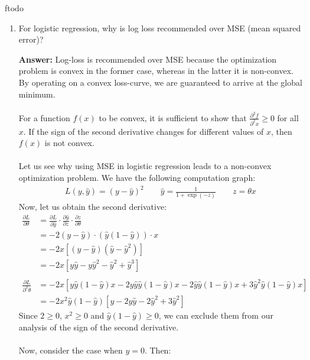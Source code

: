 ƒtodo\documentclass{article}
\newenvironment{QandA}{\begin{enumerate}[label=\arabic*.]}{\end{enumerate}}
\newenvironment{answer}{\par\normalfont \textbf{Answer:}}{}
\begin{document}
\begin{QandA}
    \item For logistic regression, why is log loss recommended over MSE (mean squared error)?
    \begin{answer}
        Log-loss is recommended over MSE because the optimization problem is convex in the former case, whereas in the latter it is non-convex. By operating on a convex loss-curve, we are guaranteed to arrive at the global minimum. \\\\
        For a function $f(x)$ to be convex, it is sufficient to show that $\frac{\partial^2 f}{\partial^2 x} \ge 0$ for all $x$. If the sign of the second derivative changes for different values of $x$, then $f(x)$ is not convex.\\\\
        Let us see why using MSE in logistic regression leads to a non-convex optimization problem. We have the following computation graph:
        \begin{align*}
            L(y, \hat{y}) = (y - \hat{y})^2 \quad\quad \hat{y} = \frac{1}{1 + \exp(-z)} \quad\quad z = \theta x
        \end{align*}
        Now, let us obtain the second derivative:
        \begin{align*}
            \frac{\partial L}{\partial \theta} &= \frac{\partial L}{\partial \hat{y}} \cdot \frac{\partial \hat{y}}{\partial z} \cdot \frac{\partial z}{\partial \theta} \\
            &= -2(y - \hat{y}) \cdot (\hat{y}(1 - \hat{y})) \cdot x \\
            &= -2x \left[ (y - \hat{y})(\hat{y} - \hat{y}^2) \right] \\
            &= -2x \left[ y\hat{y} - y\hat{y}^2 - \hat{y}^2 + \hat{y}^3 \right] \\\\
            \frac{\partial L}{\partial^2 \theta} &= -2x \left[ y\hat{y}(1-\hat{y})x - 2 y \hat{y} \hat{y} (1-\hat{y})x - 2 \hat{y}\hat{y}(1-\hat{y})x + 3\hat{y}^2\hat{y}(1-\hat{y})x \right] \\
            &= -2x^2\hat{y}(1-\hat{y}) \left[ y - 2y\hat{y} - 2\hat{y}^2 +3\hat{y}^2 \right]
        \end{align*}
        Since $2 \ge 0$, $x^2 \ge 0$ and $\hat{y}(1-\hat{y}) \ge 0$, we can exclude them from our analysis of the sign of the second derivative.\\\\
        Now, consider the case when $y=0$. Then:
        \begin{align*}

\end{align*}
\end{answer}
\end{QandA}
\end{document}
